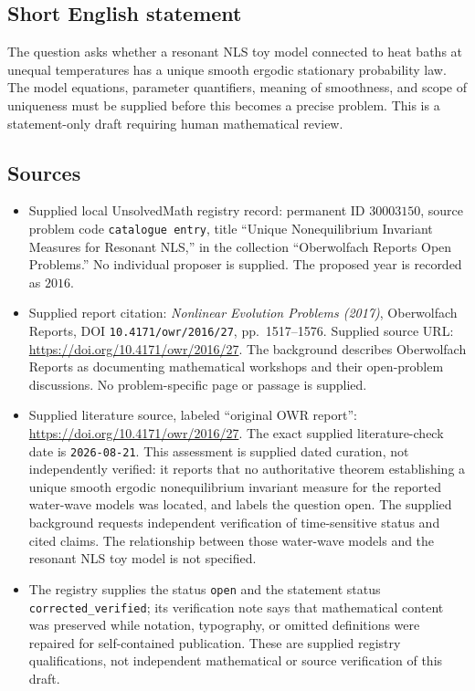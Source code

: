 \documentclass[11pt]{article}
\begin{document}
\subsection{Short English statement}
The question asks whether a resonant NLS toy model connected to heat baths at unequal temperatures has a unique smooth ergodic stationary probability law. The model equations, parameter quantifiers, meaning of smoothness, and scope of uniqueness must be supplied before this becomes a precise problem. This is a statement-only draft requiring human mathematical review.
\subsection{Sources}
\begin{itemize}
\item Supplied local UnsolvedMath registry record: permanent ID \(30003150\), source problem code \texttt{catalogue entry}, title ``Unique Nonequilibrium Invariant Measures for Resonant NLS,'' in the collection ``Oberwolfach Reports Open Problems.'' No individual proposer is supplied. The proposed year is recorded as \(2016\).
\item Supplied report citation: \emph{Nonlinear Evolution Problems (2017)}, Oberwolfach Reports, DOI \texttt{10.4171/owr/2016/27}, pp.\ 1517--1576. Supplied source URL: \url{https://doi.org/10.4171/owr/2016/27}. The background describes Oberwolfach Reports as documenting mathematical workshops and their open-problem discussions. No problem-specific page or passage is supplied.
\item Supplied literature source, labeled ``original OWR report'': \url{https://doi.org/10.4171/owr/2016/27}. The exact supplied literature-check date is \texttt{2026-08-21}. This assessment is supplied dated curation, not independently verified: it reports that no authoritative theorem establishing a unique smooth ergodic nonequilibrium invariant measure for the reported water-wave models was located, and labels the question open. The supplied background requests independent verification of time-sensitive status and cited claims. The relationship between those water-wave models and the resonant NLS toy model is not specified.
\item The registry supplies the status \texttt{open} and the statement status \texttt{corrected\_verified}; its verification note says that mathematical content was preserved while notation, typography, or omitted definitions were repaired for self-contained publication. These are supplied registry qualifications, not independent mathematical or source verification of this draft.
\end{itemize}
\end{document}
